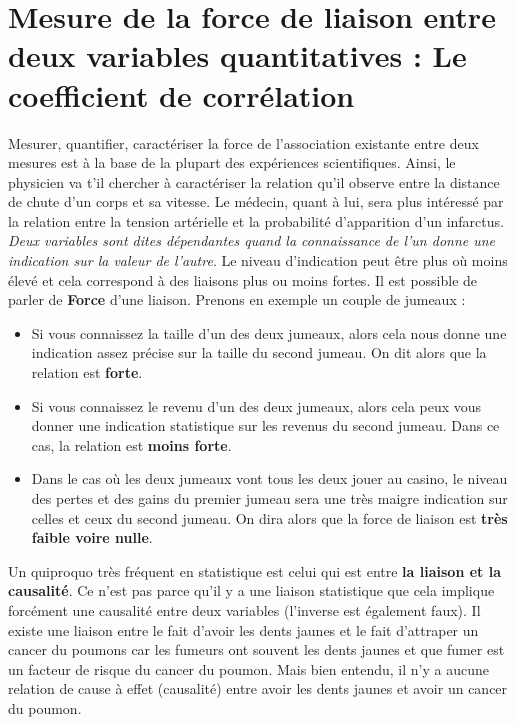 \section{Mesure de la force de liaison entre deux variables quantitatives : Le coefficient de corrélation}
Mesurer, quantifier, caractériser la force de l'association existante entre deux mesures est à la base de la plupart des expériences scientifiques. Ainsi, le physicien va t'il chercher à caractériser la relation qu'il observe entre la distance de chute d'un corps et sa vitesse. Le médecin, quant à lui, sera plus intéressé par la relation entre la tension artérielle et la probabilité d'apparition d'un infarctus.\newline
\\
\textit{Deux variables sont dites dépendantes quand la connaissance de l'un donne une indication sur la valeur de l'autre}. Le niveau d'indication peut être plus où moins élevé et cela correspond à des liaisons plus ou moins fortes.\newline
Il est possible de parler de \textbf{Force} d'une liaison. Prenons en exemple un couple de jumeaux : 
\begin{itemize}
\item Si vous connaissez la taille d'un des deux jumeaux, alors cela nous donne une indication assez précise sur la taille  du second jumeau. On dit alors que la relation est \textbf{forte}.
\item Si vous connaissez le revenu d'un des deux jumeaux, alors cela peux vous donner une indication statistique sur les revenus du second jumeau. Dans ce cas, la relation est \textbf{moins forte}.
\item Dans le cas où les deux jumeaux vont tous les deux jouer au casino, le niveau des pertes et des gains du premier jumeau sera une très maigre indication sur celles et ceux du second jumeau. On dira alors que la force de liaison est \textbf{très faible voire nulle}.
\end{itemize}
Un quiproquo très fréquent en statistique est celui qui est entre \textbf{la liaison et la causalité}. Ce n'est pas parce qu'il y a une liaison statistique que cela implique forcément une causalité entre deux variables (l'inverse est également faux).\newline
Il existe une liaison entre le fait d'avoir les dents jaunes et le fait d'attraper un cancer du poumons car les fumeurs ont souvent les dents jaunes et que fumer est un facteur de risque du cancer du poumon. Mais bien entendu, il n'y a aucune relation de cause à effet (causalité) entre avoir les dents jaunes et avoir un cancer du poumon.\newline
